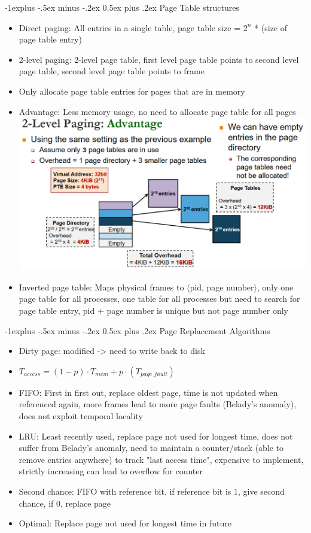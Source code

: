\documentclass[10pt, landscape]{article}
\makeatletter
\renewcommand{\subsection}{\@startsection{subsection}{2}{0mm}%
                                {-1explus -.5ex minus -.2ex}%
                                {0.5ex plus .2ex}%
                                {\normalfont\normalsize\bfseries}}
\makeatother
\begin{document}
\begin{multicols*}{3}
\subsection{Page Table structures}
\begin{itemize}
\item Direct paging: All entries in a single table, page table size = $2^n$ * (size of page table entry)
\item 2-level paging: 2-level page table, first level page table points to second level page table, second level page table points to frame
\item Only allocate page table entries for pages that are in memory
\item Advantage: Less memory usage, no need to allocate page table for all pages \includegraphics[width=\columnwidth]{2-level paging.png}
\item Inverted page table: Maps physical frames to $\langle$pid, page number$\rangle$, only one page table for all processes, one table for all processes but need to search for page table entry, pid + page number is unique but not page number only
\end{itemize}

\subsection{Page Replacement Algorithms}
\begin{itemize}
\item Dirty page: modified -> need to write back to disk
\item $T_{access} = (1 - p) \cdot T_{mem} + p \cdot (T_{page\_fault})$
\item FIFO: First in first out, replace oldest page, time is not updated when referenced again, more frames lead to more page faults (Belady's anomaly), does not exploit temporal locality
\item LRU: Least recently used, replace page not used for longest time, does not suffer from Belady's anomaly, need to maintain a counter/stack (able to remove entries anywhere) to track "last access time", expensive to implement, strictly increasing can lead to overflow for counter
\item Second chance: FIFO with reference bit, if reference bit is 1, give second chance, if 0, replace page
\item Optimal: Replace page not used for longest time in future
\end{itemize}


\end{multicols*}
\end{document}
